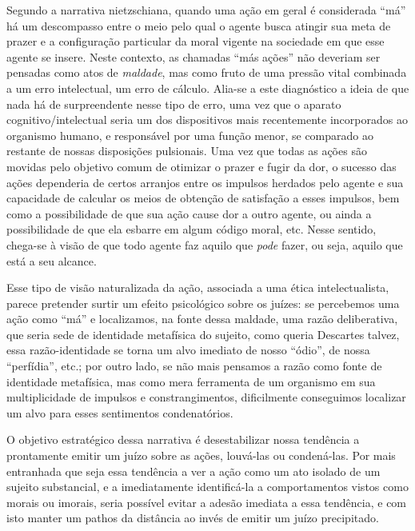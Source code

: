 \documentclass[
	12pt,				%
	openright,			%
	oneside,			%
	a4paper,			%
	english,			%
	french,				%
	spanish,			%
	brazil				%
	]{abntex2}
\begin{document}
Segundo a narrativa nietzschiana, quando uma ação em geral é considerada “má” há um descompasso entre o meio pelo qual o agente busca atingir sua meta de prazer e a configuração particular da moral vigente na sociedade em que esse agente se insere. Neste contexto, as chamadas “más ações” não deveriam ser pensadas como atos de \textit{maldade}, mas como fruto de uma pressão vital combinada a um erro intelectual, um erro de cálculo. Alia-se a este diagnóstico a ideia de que nada há de surpreendente nesse tipo de erro, uma vez que o aparato cognitivo/intelectual seria um dos dispositivos mais recentemente incorporados ao organismo humano, e responsável por uma função menor, se comparado ao restante de nossas disposições pulsionais. Uma vez que todas as ações são movidas pelo objetivo comum de otimizar o prazer e fugir da dor, o sucesso das ações dependeria de certos arranjos entre os impulsos herdados pelo agente e sua capacidade de calcular os meios de obtenção de satisfação a esses impulsos, bem como a possibilidade de que sua ação cause dor a outro agente, ou ainda a possibilidade de que ela esbarre em algum código moral, etc. Nesse sentido, chega-se à visão de que todo agente faz aquilo que \textit{pode} fazer, ou seja, aquilo que está a seu alcance. 

	Esse tipo de visão naturalizada da ação, associada a uma ética intelectualista, parece pretender surtir um efeito psicológico sobre os juízes: se percebemos uma ação como “má” e localizamos, na fonte dessa maldade, uma razão deliberativa, que seria sede de identidade metafísica do sujeito, como queria Descartes talvez, essa razão-identidade se torna um alvo imediato de nosso “ódio”, de nossa “perfídia”, etc.; por outro lado, se não mais pensamos a razão como fonte de identidade metafísica, mas como mera ferramenta de um organismo em sua multiplicidade de impulsos e constrangimentos, dificilmente conseguimos localizar um alvo para esses sentimentos condenatórios.

	O objetivo estratégico dessa narrativa é desestabilizar nossa tendência a prontamente emitir um juízo sobre as ações, louvá-las ou condená-las. Por mais entranhada que seja essa tendência a ver a ação como um ato isolado de um sujeito substancial, e a imediatamente identificá-la a comportamentos vistos como morais ou imorais, seria possível evitar a adesão imediata a essa tendência, e com isto manter um pathos da distância ao invés de emitir um juízo precipitado.
\end{document}
